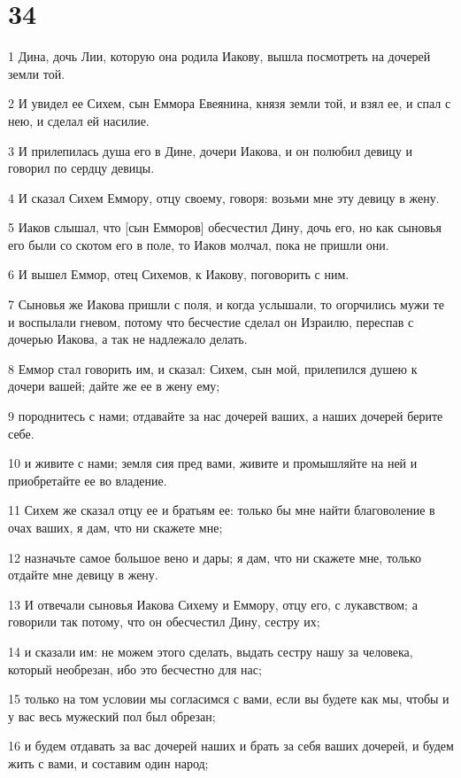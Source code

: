 \chapter{34}

\par 1 Дина, дочь Лии, которую она родила Иакову, вышла посмотреть на дочерей земли той.
\par 2 И увидел ее Сихем, сын Еммора Евеянина, князя земли той, и взял ее, и спал с нею, и сделал ей насилие.
\par 3 И прилепилась душа его в Дине, дочери Иакова, и он полюбил девицу и говорил по сердцу девицы.
\par 4 И сказал Сихем Еммору, отцу своему, говоря: возьми мне эту девицу в жену.
\par 5 Иаков слышал, что [сын Емморов] обесчестил Дину, дочь его, но как сыновья его были со скотом его в поле, то Иаков молчал, пока не пришли они.
\par 6 И вышел Еммор, отец Сихемов, к Иакову, поговорить с ним.
\par 7 Сыновья же Иакова пришли с поля, и когда услышали, то огорчились мужи те и воспылали гневом, потому что бесчестие сделал он Израилю, переспав с дочерью Иакова, а так не надлежало делать.
\par 8 Еммор стал говорить им, и сказал: Сихем, сын мой, прилепился душею к дочери вашей; дайте же ее в жену ему;
\par 9 породнитесь с нами; отдавайте за нас дочерей ваших, а наших дочерей берите себе.
\par 10 и живите с нами; земля сия пред вами, живите и промышляйте на ней и приобретайте ее во владение.
\par 11 Сихем же сказал отцу ее и братьям ее: только бы мне найти благоволение в очах ваших, я дам, что ни скажете мне;
\par 12 назначьте самое большое вено и дары; я дам, что ни скажете мне, только отдайте мне девицу в жену.
\par 13 И отвечали сыновья Иакова Сихему и Еммору, отцу его, с лукавством; а говорили так потому, что он обесчестил Дину, сестру их;
\par 14 и сказали им: не можем этого сделать, выдать сестру нашу за человека, который необрезан, ибо это бесчестно для нас;
\par 15 только на том условии мы согласимся с вами, если вы будете как мы, чтобы и у вас весь мужеский пол был обрезан;
\par 16 и будем отдавать за вас дочерей наших и брать за себя ваших дочерей, и будем жить с вами, и составим один народ;
